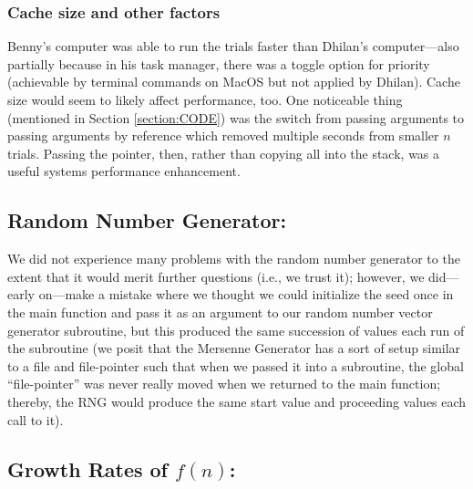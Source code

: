 \documentclass[conference]{styles/acmsiggraph}
\newcommand{\?}{\stackrel{?}{=}}
\begin{document}
\subsubsection{Cache size and other factors}
Benny's computer was able to run the trials faster than Dhilan's computer---also partially because in his task manager, there was a toggle option for priority (achievable by terminal commands on MacOS but not applied by Dhilan).  Cache size would seem to likely affect performance, too.  One noticeable thing (mentioned in Section \ref{section:CODE}) was the switch from passing arguments to passing arguments by reference which removed multiple seconds from smaller $n$ trials.  Passing the pointer, then, rather than copying all into the stack, was a useful systems performance enhancement.



\subsection{Random Number Generator:}
We did not experience many problems with the random number generator to the extent that it would merit further questions (i.e., we trust it); however, we did---early on---make a mistake where we thought we could initialize the seed once in the main function and pass it as an argument to our random number vector generator subroutine, but this produced the same succession of values each run of the subroutine (we posit that the Mersenne Generator has a sort of setup similar to a file and file-pointer such that when we passed it into a subroutine, the global \enquote{file-pointer} was never really moved when we returned to the main function; thereby, the RNG would produce the same start value and proceeding values each call to it).



\subsection{Growth Rates of $f(n)$:}
\end{document}
